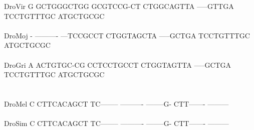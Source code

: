 \documentclass[11pt,twoside,reqno,a4paper]{article}
\begin{document}
{DroVir	G	GCTGGGCTGG	GCGTCCG-CT	CTGGCAGTTA	-----GTTGA	TCCTGTTTGC	ATGCTGCGC\\
\hspace*{7\charwidth}\hspace*{1\charwidth}\hspace*{1\charwidth}\hspace*{1\charwidth}\hspace*{1\charwidth}\hspace*{1\charwidth}\hspace*{1\charwidth}\\
DroMoj	-	----------	---TCCGCCT	CTGGTAGCTA	-----GCTGA	TCCTGTTTGC	ATGCTGCGC\\
\hspace*{7\charwidth}\hspace*{1\charwidth}\hspace*{1\charwidth}\hspace*{1\charwidth}\hspace*{1\charwidth}\hspace*{1\charwidth}\hspace*{1\charwidth}\\
DroGri	A	ACTGTGC-CG	CCTCCTGCCT	CTGGTAGTTA	-----GCTGA	TCCTGTTTGC	ATGCTGCGC\\
\hspace*{7\charwidth}\hspace*{1\charwidth}\hspace*{1\charwidth}\hspace*{1\charwidth}\hspace*{1\charwidth}\hspace*{1\charwidth}\hspace*{1\charwidth}\\
\\
DroMel	C	CTTCACAGCT	TC--------	----------	--------G-	CTT-------	---------\\
\hspace*{7\charwidth}\hspace*{1\charwidth}\hspace*{1\charwidth}\hspace*{1\charwidth}\hspace*{1\charwidth}\hspace*{1\charwidth}\hspace*{1\charwidth}\\
DroSim	C	CTTCACAGCT	TC--------	----------	--------G-	CTT-------	---------\\
\hspace*{7\charwidth}\hspace*{1\charwidth}\hspace*{1\charwidth}\hspace*{1\charwidth}\hspace*{1\charwidth}\hspace*{1\charwidth}\hspace*{1\charwidth}\\
}
\end{document}

